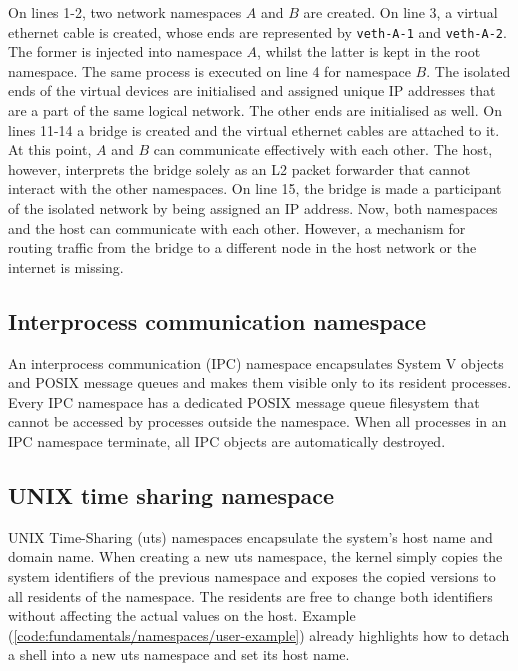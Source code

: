On lines 1-2, two network namespaces $A$ and $B$ are created. On line 3, a virtual ethernet 
cable is created, whose ends are represented by \verb|veth-A-1| and \verb|veth-A-2|. The former 
is injected into namespace $A$, whilst the latter is kept in the root namespace. 
The same process is executed on line 4 for namespace $B$. The isolated ends of the 
virtual devices are initialised and assigned unique IP addresses that are a part of the same logical network.
The other ends are initialised as well. On lines 11-14 a bridge is created and the 
virtual ethernet cables are attached to it. At this point, $A$ and $B$ can communicate 
effectively with each other. The host, however, interprets the bridge solely as an L2 packet 
forwarder that cannot interact with the other namespaces. On line 15, the bridge
is made a participant of the isolated network by being assigned an IP address.
Now, both namespaces and the host can communicate with each other. 
However, a mechanism for routing traffic from the bridge to a different node in the 
host network or the internet is missing. 

\subsection{Interprocess communication namespace}
\label{sections:fundamentals/namespaces/ipc}
An interprocess communication (IPC) namespace encapsulates System V objects and POSIX 
message queues and makes them visible only to its resident processes.
Every IPC namespace has a dedicated POSIX message queue filesystem
that cannot be accessed by processes outside the namespace.
When all processes in an IPC namespace terminate, all IPC objects are automatically
destroyed. 

\subsection{UNIX time sharing namespace}
\label{sections:fundamentals/namespaces/uts}
UNIX Time-Sharing (uts) namespaces encapsulate the system's host name and domain name.
When creating a new uts namespace, the kernel simply copies the system identifiers of the 
previous namespace and exposes the copied versions to all residents of the namespace. 
The residents are free to change both identifiers without affecting the actual values 
on the host. Example (\ref{code:fundamentals/namespaces/user-example}) already highlights 
how to detach a shell into a new uts namespace and set its host name.
